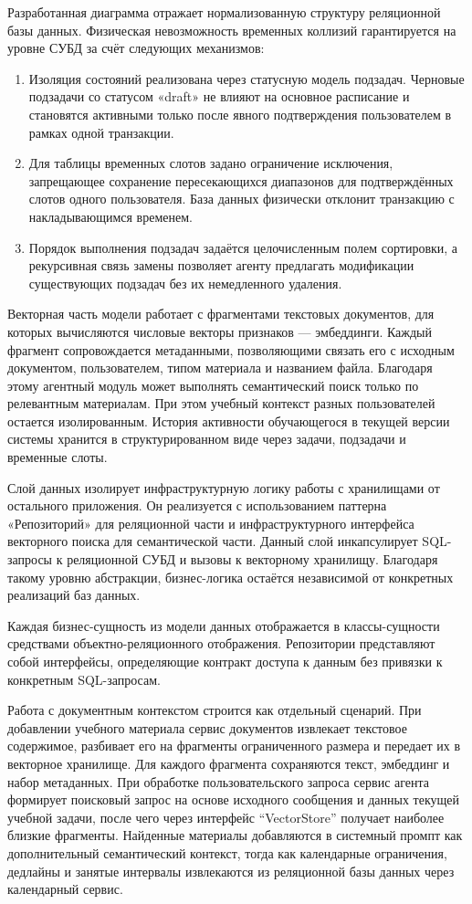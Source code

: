 Разработанная диаграмма отражает нормализованную структуру реляционной базы данных. Физическая невозможность временных коллизий гарантируется на уровне СУБД за счёт следующих механизмов:
\begin{enumerate}[label=\arabic*]
    \item Изоляция состояний реализована через статусную модель подзадач. Черновые подзадачи со статусом «draft» не влияют на основное расписание и становятся активными только после явного подтверждения пользователем в рамках одной транзакции.
    \item Для таблицы временных слотов задано ограничение исключения, запрещающее сохранение пересекающихся диапазонов для подтверждённых слотов одного пользователя. База данных физически отклонит транзакцию с накладывающимся временем.
    \item Порядок выполнения подзадач задаётся целочисленным полем сортировки, а рекурсивная связь замены позволяет агенту предлагать модификации существующих подзадач без их немедленного удаления.
\end{enumerate}

Векторная часть модели работает с фрагментами текстовых документов, для которых вычисляются числовые векторы признаков — эмбеддинги. 
Каждый фрагмент сопровождается метаданными, позволяющими связать его с исходным документом, пользователем, типом материала и названием файла. 
Благодаря этому агентный модуль может выполнять семантический поиск только по релевантным материалам. При этом учебный контекст разных пользователей остается изолированным. 
История активности обучающегося в текущей версии системы хранится в структурированном виде через задачи, подзадачи и временные слоты.

\numberedparagraph
Слой данных изолирует инфраструктурную логику работы с хранилищами от остального приложения. Он реализуется с использованием паттерна «Репозиторий» для реляционной части и инфраструктурного интерфейса векторного поиска для семантической части. Данный слой инкапсулирует SQL-запросы к реляционной СУБД и вызовы к векторному хранилищу. Благодаря такому уровню абстракции, бизнес-логика остаётся независимой от конкретных реализаций баз данных.

Каждая бизнес-сущность из модели данных отображается в классы-сущности средствами объектно-реляционного отображения. Репозитории представляют собой интерфейсы, определяющие контракт доступа к данным без привязки к конкретным SQL-запросам.

Работа с документным контекстом строится как отдельный сценарий. При добавлении учебного материала сервис документов извлекает текстовое содержимое, разбивает его на фрагменты ограниченного размера и передает их в векторное хранилище. Для каждого фрагмента сохраняются текст, эмбеддинг и набор метаданных. При обработке пользовательского запроса сервис агента формирует поисковый запрос на основе исходного сообщения и данных текущей учебной задачи, после чего через интерфейс ``VectorStore'' получает наиболее близкие фрагменты. Найденные материалы добавляются в системный промпт как дополнительный семантический контекст, тогда как календарные ограничения, дедлайны и занятые интервалы извлекаются из реляционной базы данных через календарный сервис.

